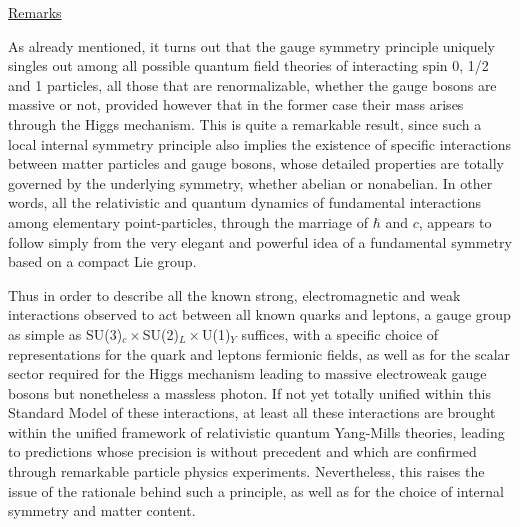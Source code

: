 \documentclass[a4paper,11pt]{article}
\begin{document}
\vspace{10pt}

\noindent\underline{Remarks}

\vspace{5pt}

As already mentioned, it turns out that the gauge symmetry principle
uniquely singles out among all possible quantum field theories of
interacting spin 0, 1/2 and 1 particles, all those that are
renormalizable, whether the gauge bosons are massive or not, provided
however that in the former case their mass arises through the Higgs
mechanism.\cite{HV} This is quite a re\-mar\-ka\-ble result, since such a local 
internal symmetry principle also implies the existence of specific interactions
between matter particles and gauge bosons, whose detailed properties are
totally governed by the underlying symmetry, whether abelian or nonabelian.
In other words, all the relativistic and quantum dynamics of fundamental
interactions among elementary point-particles, through the marriage of 
$\hbar$ and $c$, appears to follow simply from the very elegant and powerful
idea of a fundamental symmetry based on a compact Lie group.

Thus in order to describe all the known strong, electromagnetic and weak
interactions observed to act between all known quarks and leptons,
a gauge group as simple as SU(3)$_c\times$SU(2)$_L\times$U(1)$_Y$
suffices, with a specific choice of representations for the quark
and leptons fermionic fields, as well as for the scalar sector
required for the Higgs mechanism leading to massive electroweak gauge
bosons but nonetheless a massless photon. If not yet totally unified
within this Standard Model of these interactions, at least all these
interactions are brought within the unified framework of relativistic
quantum Yang-Mills theories, leading to predictions whose precision is
without precedent and which are confirmed through remarkable particle
physics experiments. Nevertheless, this raises the issue of the
rationale behind such a principle, as well as for the choice of internal
symmetry and matter content.
\end{document}
